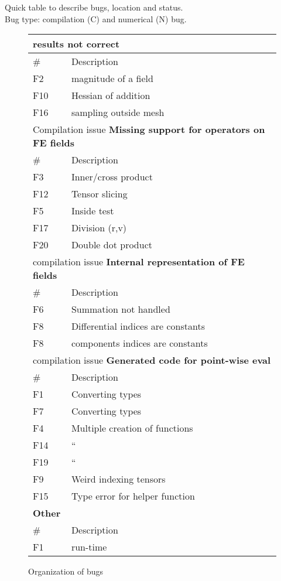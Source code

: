 \documentclass{article}
\begin{document}
Quick table to describe bugs, location and status.\\
Bug type: compilation (C) and numerical (N) bug.\\


\begin{figure}
\begin{tabular}{|l|l|} 
\hline
\multicolumn{2}{|l|}{\textbf{results not correct}}\\
\hline
\# &Description \\
\hline
 F2   & magnitude of a field\\
 F10   &  Hessian of addition \\
   F16    & sampling outside mesh  \\
\hline
\hline
\multicolumn{2}{|l|}{Compilation issue \textbf{ Missing support for operators on FE fields}}\\
\hline
\# & Description \\
\hline
 F3 & Inner/cross product \\
F12 & Tensor slicing\\
   F5 &Inside test\\
F17  &   Division (r,v)\\
  F20  & Double dot product\\
\hline  
\hline
\multicolumn{2}{|l|}{ compilation issue \textbf{ Internal representation of FE fields}}\\
\hline
\# & Description \\
\hline
 F6   & Summation not handled \\
  F8  & Differential indices are constants\\
    F8  &components indices are constants\\
\hline    
\hline
\multicolumn{2}{|l|}{compilation issue \textbf{Generated code for point-wise eval}}\\
\hline
\# & Description \\
\hline
 F1 &Converting types\\
F7  & Converting types\\
 F4   &Multiple creation of functions  \\
F14   & ``\\
F19   & ``\\
   F9  &   Weird indexing tensors\\
 F15  &  Type error for helper function\\
\hline  
\hline
\multicolumn{2}{|l|}{\textbf{Other}}\\
\hline
\# & Description \\
\hline
  F1   &run-time\\
\hline
\end{tabular}
\caption{Organization of bugs}
\label{bugs}
\end{figure}
\end{document}

